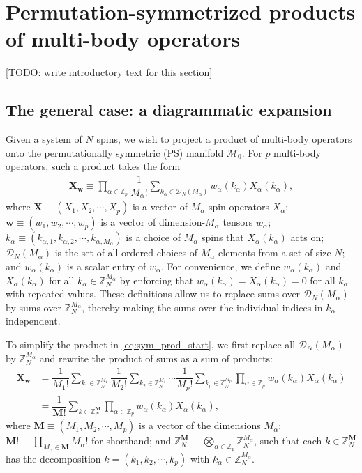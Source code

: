 \documentclass[nofootinbib,notitlepage,11pt]{revtex4-2}
\newcommand{\f}[2]{\dfrac{#1}{#2}} %
\newcommand{\p}[1]{\left(#1\right)} %
\newcommand{\m}{\bm} %
\newcommand{\1}{\mathds{1}}
\newcommand{\D}{\mathcal{D}}
\newcommand{\M}{\mathcal{M}}
\newcommand{\ZZ}{\mathbb{Z}}
\newcommand{\red}[1]{{\color{red} #1}}
\begin{document}
\section{Permutation-symmetrized products of multi-body operators}
\label{sec:operator_product}

\red{[TODO: write introductory text for this section]}

\subsection{The general case: a diagrammatic expansion}

Given a system of $N$ spins, we wish to project a product of
multi-body operators onto the permutationally symmetric (PS) manifold
$\M_0$.  For $p$ multi-body operators, such a product takes the form
\begin{align}
  \m X_{\m w}
  \equiv \prod_{\alpha\in\ZZ_p} \f1{M_\alpha!}
  \sum_{k_\alpha\in\D_N\p{M_\alpha}}
  w_\alpha\p{k_\alpha} X_\alpha\p{k_\alpha},
  \label{eq:sym_prod_start}
\end{align}
where $\m X\equiv\p{X_1,X_2,\cdots,X_p}$ is a vector of
$M_\alpha$-spin operators $X_\alpha$;
$\m w\equiv\p{w_1,w_2,\cdots,w_p}$ is a vector of dimension-$M_\alpha$
tensors $w_\alpha$;
$k_\alpha\equiv\p{k_{\alpha,1},k_{\alpha,2},\cdots,k_{\alpha,M_\alpha}}$
is a choice of $M_\alpha$ spins that $X_\alpha\p{k_\alpha}$ acts on;
$\D_N\p{M_\alpha}$ is the set of all ordered choices of $M_\alpha$
elements from a set of size $N$; and $w_\alpha\p{k_\alpha}$ is a
scalar entry of $w_\alpha$.  For convenience, we define
$w_\alpha\p{k_\alpha}$ and $X_\alpha\p{k_\alpha}$ for all
$k_\alpha\in\ZZ_N^{M_\alpha}$ by enforcing that
$w_\alpha\p{k_\alpha}=X_\alpha\p{k_\alpha}=0$ for all $k_\alpha$ with
repeated values.  These definitions allow us to replace sums over
$\D_N\p{M_\alpha}$ by sums over $\ZZ_N^{M_\alpha}$, thereby making the
sums over the individual indices in $k_\alpha$ independent.

To simplify the product in \eqref{eq:sym_prod_start}, we first replace
all $\D_N\p{M_\alpha}$ by $\ZZ_N^{M_\alpha}$ and rewrite the product
of sums as a sum of products:
\begin{align}
  \m X_{\m w}
  &= \f1{M_1!} \sum_{k_1\in\ZZ_N^{M_1}}
  \f1{M_2!} \sum_{k_2\in\ZZ_N^{M_1}} \cdots
  \f1{M_p!} \sum_{k_p\in\ZZ_N^{M_p}}
  \prod_{\alpha\in\ZZ_p} w_\alpha\p{k_\alpha} X_\alpha\p{k_\alpha} \\
  &= \f1{\m M!} \sum_{k\in\ZZ_N^{\m M}} \prod_{\alpha\in\ZZ_p}
  w_\alpha\p{k_\alpha} X_\alpha\p{k_\alpha},
  \label{eq:sum_of_products}
\end{align}
where $\m M\equiv\p{M_1,M_2,\cdots,M_p}$ is a vector of the dimensions
$M_\alpha$; $\m M!\equiv\prod_{M_\alpha\in\m M}M_\alpha!$ for
shorthand; and
$\ZZ_N^{\m M}\equiv\bigotimes_{\alpha\in\ZZ_p}\ZZ_N^{M_\alpha}$, such
that each $k\in\ZZ_N^{\m M}$ has the decomposition
$k=\p{k_1,k_2,\cdots,k_p}$ with $k_\alpha\in\ZZ_N^{M_\alpha}$.
\end{document}
